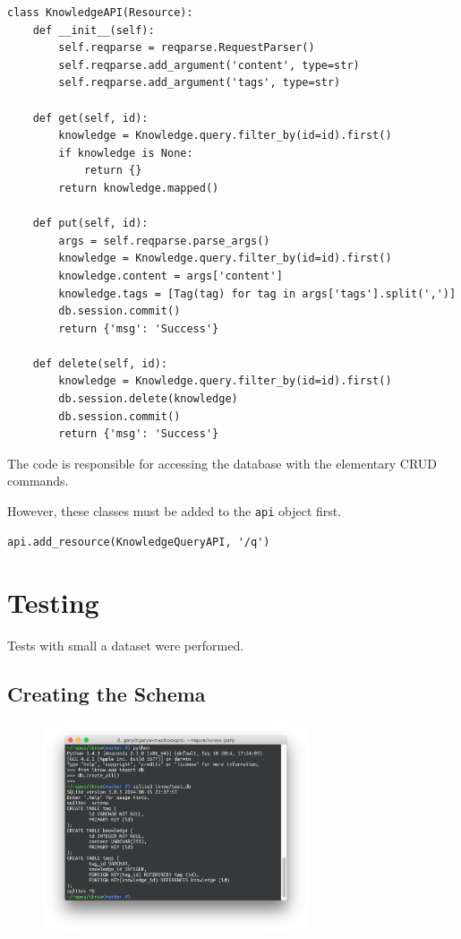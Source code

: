\documentclass[11pt, a4paper]{article}
\begin{document}
\begin{lstlisting}
class KnowledgeAPI(Resource):
    def __init__(self):
        self.reqparse = reqparse.RequestParser()
        self.reqparse.add_argument('content', type=str)
        self.reqparse.add_argument('tags', type=str)

    def get(self, id):
        knowledge = Knowledge.query.filter_by(id=id).first()
        if knowledge is None:
            return {}
        return knowledge.mapped()

    def put(self, id):
        args = self.reqparse.parse_args()
        knowledge = Knowledge.query.filter_by(id=id).first()
        knowledge.content = args['content']
        knowledge.tags = [Tag(tag) for tag in args['tags'].split(',')]
        db.session.commit()
        return {'msg': 'Success'}

    def delete(self, id):
        knowledge = Knowledge.query.filter_by(id=id).first()
        db.session.delete(knowledge)
        db.session.commit()
        return {'msg': 'Success'}
\end{lstlisting}

\vspace{10pt}

The code is responsible for accessing the database with the elementary CRUD
commands. 

However, these classes must be added to the \lstinline|api| object first. 

\begin{lstlisting}
api.add_resource(KnowledgeQueryAPI, '/q')
\end{lstlisting}

\subsection{}

\section{Testing}

Tests with small a dataset were performed. 

\subsection{Creating the Schema}

\begin{figure}[h!]
  \centering
  \includegraphics[width=0.7\textwidth]{img/schema}
\end{figure}
\end{document}
